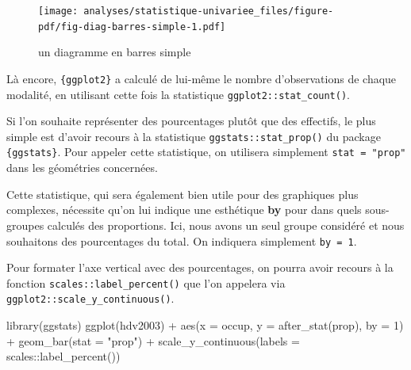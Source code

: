 \documentclass[
  letterpaper,
  DIV=11,
  numbers=noendperiod,
  oneside]{scrreprt}
\newenvironment{Shaded}{\begin{snugshade}}{\end{snugshade}}
\newcommand{\AttributeTok}[1]{\textcolor[rgb]{0.40,0.45,0.13}{#1}}
\newcommand{\DecValTok}[1]{\textcolor[rgb]{0.68,0.00,0.00}{#1}}
\newcommand{\FunctionTok}[1]{\textcolor[rgb]{0.28,0.35,0.67}{#1}}
\newcommand{\NormalTok}[1]{\textcolor[rgb]{0.00,0.23,0.31}{#1}}
\newcommand{\SpecialCharTok}[1]{\textcolor[rgb]{0.37,0.37,0.37}{#1}}
\newcommand{\StringTok}[1]{\textcolor[rgb]{0.13,0.47,0.30}{#1}}
\begin{document}
\begin{figure}[H]

{\centering \texttt{[image: analyses/statistique-univariee\_files/figure-pdf/fig-diag-barres-simple-1.pdf]}

}

\caption{\label{fig-diag-barres-simple}un diagramme en barres simple}

\end{figure}

\begin{tcolorbox}[enhanced jigsaw, colbacktitle=quarto-callout-tip-color!10!white, opacityback=0, toprule=.15mm, colback=white, coltitle=black, bottomtitle=1mm, toptitle=1mm, titlerule=0mm, rightrule=.15mm, title=\textcolor{quarto-callout-tip-color}{\faLightbulb}\hspace{0.5em}{Astuce}, breakable, bottomrule=.15mm, opacitybacktitle=0.6, arc=.35mm, left=2mm, leftrule=.75mm, colframe=quarto-callout-tip-color-frame]

Là encore, \texttt{\{ggplot2\}} a calculé de lui-même le nombre
d'observations de chaque modalité, en utilisant cette fois la
statistique \texttt{ggplot2::stat\_count()}.

\end{tcolorbox}

Si l'on souhaite représenter des pourcentages plutôt que des effectifs,
le plus simple est d'avoir recours à la statistique
\texttt{ggstats::stat\_prop()} du package
\texttt{\{ggstats\}}. Pour appeler cette statistique,
on utilisera simplement \texttt{stat\ =\ "prop"} dans les géométries
concernées.

Cette statistique, qui sera également bien utile pour des graphiques
plus complexes, nécessite qu'on lui indique une esthétique \textbf{by}
pour dans quels sous-groupes calculés des proportions. Ici, nous avons
un seul groupe considéré et nous souhaitons des pourcentages du total.
On indiquera simplement \texttt{by\ =\ 1}.

Pour formater l'axe vertical avec des pourcentages, on pourra avoir
recours à la fonction \texttt{scales::label\_percent()} que l'on
appelera via \texttt{ggplot2::scale\_y\_continuous()}.

\begin{Shaded}
\begin{Highlighting}[]
\FunctionTok{library}\NormalTok{(ggstats)}
\FunctionTok{ggplot}\NormalTok{(hdv2003) }\SpecialCharTok{+}
  \FunctionTok{aes}\NormalTok{(}\AttributeTok{x =}\NormalTok{ occup, }\AttributeTok{y =} \FunctionTok{after\_stat}\NormalTok{(prop), }\AttributeTok{by =} \DecValTok{1}\NormalTok{) }\SpecialCharTok{+}
  \FunctionTok{geom\_bar}\NormalTok{(}\AttributeTok{stat =} \StringTok{"prop"}\NormalTok{) }\SpecialCharTok{+}
  \FunctionTok{scale\_y\_continuous}\NormalTok{(}\AttributeTok{labels =}\NormalTok{ scales}\SpecialCharTok{::}\FunctionTok{label\_percent}\NormalTok{())}
\end{Highlighting}
\end{Shaded}
\end{document}
